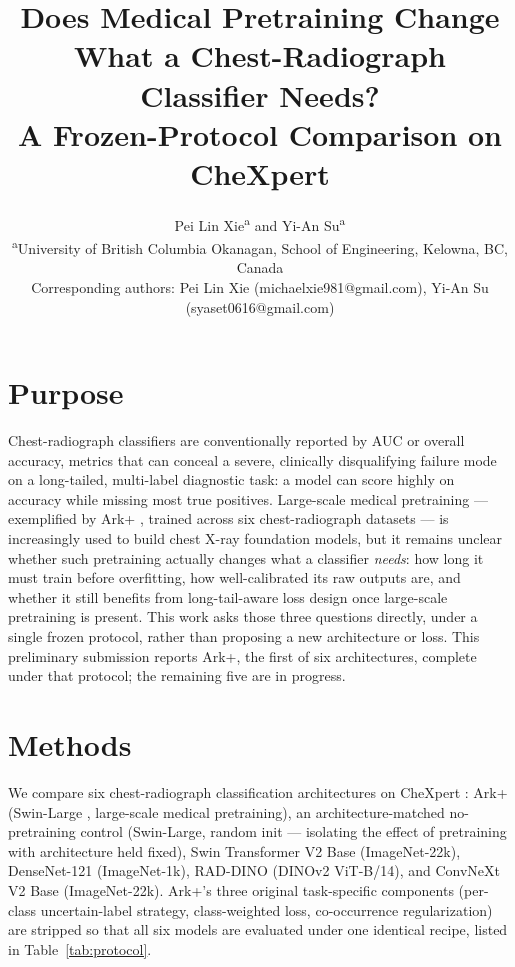 \documentclass[11pt]{article}
\title{\vspace{-1.5em}\Large\bfseries Does Medical Pretraining Change What a Chest-Radiograph Classifier Needs?\\[2pt] A Frozen-Protocol Comparison on CheXpert}
\author{
  Pei Lin Xie\textsuperscript{a} and Yi-An Su\textsuperscript{a} \\[2pt]
  \small \textsuperscript{a}University of British Columbia Okanagan, School of Engineering, Kelowna, BC, Canada \\
  \small Corresponding authors: Pei Lin Xie (michaelxie981@gmail.com), Yi-An Su (syaset0616@gmail.com)
}
\date{}
\begin{document}
\maketitle
\vspace{-2em}

\section*{Purpose}

Chest-radiograph classifiers are conventionally reported by AUC or overall accuracy, metrics that can conceal a severe, clinically disqualifying failure mode on a long-tailed, multi-label diagnostic task: a model can score highly on accuracy while missing most true positives. Large-scale medical pretraining --- exemplified by Ark+ \cite{ma2025ark}, trained across six chest-radiograph datasets --- is increasingly used to build chest X-ray foundation models, but it remains unclear whether such pretraining actually changes what a classifier \emph{needs}: how long it must train before overfitting, how well-calibrated its raw outputs are, and whether it still benefits from long-tail-aware loss design once large-scale pretraining is present. This work asks those three questions directly, under a single frozen protocol, rather than proposing a new architecture or loss. This preliminary submission reports Ark+, the first of six architectures, complete under that protocol; the remaining five are in progress.

\section*{Methods}

We compare six chest-radiograph classification architectures on CheXpert \cite{irvin2019chexpert}: Ark+ (Swin-Large \cite{liu2021swin}, large-scale medical pretraining), an architecture-matched no-pretraining control (Swin-Large, random init --- isolating the effect of pretraining with architecture held fixed), Swin Transformer V2 Base \cite{liu2022swinv2} (ImageNet-22k), DenseNet-121 \cite{huang2017densenet} (ImageNet-1k), RAD-DINO \cite{perezgarcia2025raddino} (DINOv2 ViT-B/14), and ConvNeXt V2 Base \cite{woo2023convnextv2} (ImageNet-22k). Ark+'s three original task-specific components (per-class uncertain-label strategy, class-weighted loss, co-occurrence regularization) are stripped so that all six models are evaluated under one identical recipe, listed in Table~\ref{tab:protocol}.
\end{document}
